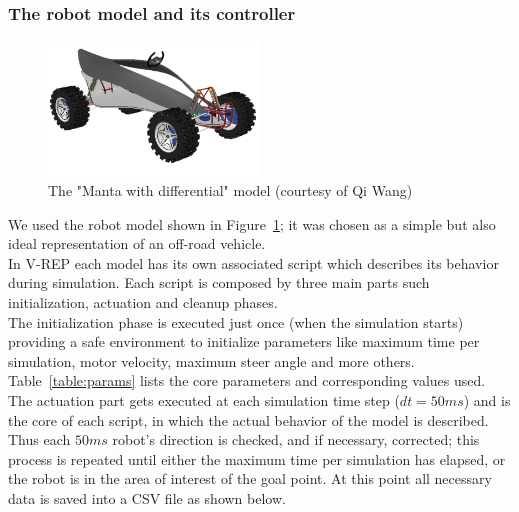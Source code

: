 \documentclass[]{usiinfbachelorproject}
\begin{document}
\subsubsection{The robot model and its controller}
\begin{figure} [h]
\centering
\includegraphics[width=0.5\textwidth]{robot}
    \caption{The "Manta with differential" model (courtesy of Qi Wang)}
\label{fig:robot}
\end{figure}
\noindent
We used the robot model shown in Figure~\ref{fig:robot}; it was chosen as a simple but also ideal representation of an off-road vehicle.\\
In V-REP each model has its own associated script which describes its behavior during simulation. Each script is composed by three main parts such initialization, actuation and cleanup phases. \\
The initialization phase is executed just once (when the simulation starts) providing a safe environment to initialize parameters like maximum time per simulation, motor velocity, maximum steer
angle and more others.  Table~\ref{table:params} lists the core parameters and corresponding values used.\\
The actuation part gets executed at each simulation time step ($dt = 50ms$) and is the core of each script, in which the actual behavior of the model is described. \\
Thus each $50ms$ robot's direction is checked, and if necessary, corrected; this process is repeated until either the maximum time per simulation has elapsed, or the robot is in the
area of interest of the goal point. At this point all necessary data is saved into a CSV file as shown below. \\\\
\end{document}
